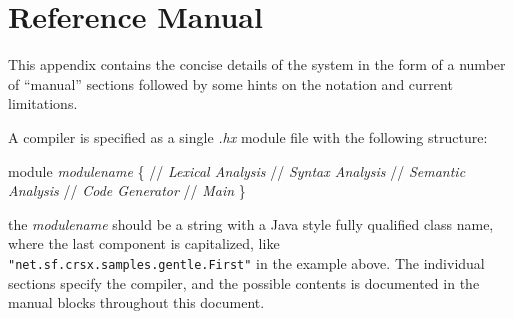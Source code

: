 \documentclass[11pt]{article} %
\begin{document}
\appendix
\section{Reference Manual}
\label{app:ref}

This appendix contains the concise details of the \HAX system in the form of a number of ``manual''
sections followed by some hints on the notation and current limitations.

\begin{manual}\label{man:structure}
  A \HAX compiler is specified as a single \emph{.hx} module file with the following structure:
\begin{code}[commandchars=\\\{\}]
module {\it\color{blue}modulename}
\{
  // {\it\color{blue}Lexical Analysis}
  // {\it\color{blue}Syntax Analysis}
  // {\it\color{blue}Semantic Analysis}
  // {\it\color{blue}Code Generator}
  // {\it\color{blue}Main}
\}
\end{code}
  the \emph{modulename} should be a string with a Java style fully qualified class name, where the
  last component is capitalized, like \verb|"net.sf.crsx.samples.gentle.First"| in the example
  above. The individual sections specify the compiler, and the possible contents is documented in
  the manual blocks throughout this document.
\end{manual}
\end{document}
